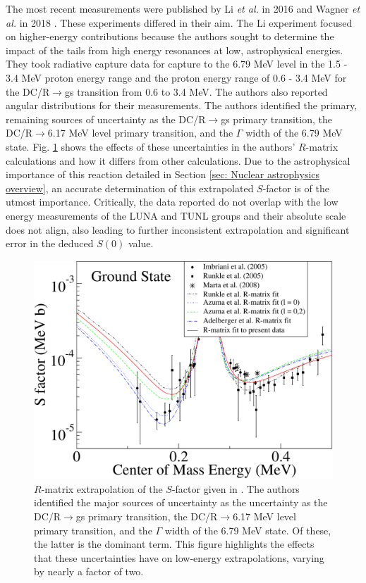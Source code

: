 The most recent measurements were published by Li \textit{et al.} in 2016 \cite{Li2016} and Wagner \textit{et al.} in 2018 \cite{Wagner2018}. These experiments differed in their aim. The Li experiment focused on higher-energy contributions because the authors sought to determine the impact of the tails from high energy resonances at low, astrophysical energies. They took radiative capture data for capture to the 6.79 MeV level in the 1.5 - 3.4 MeV proton energy range and the proton energy range of 0.6 - 3.4 MeV for the DC/R$\rightarrow$gs transition from 0.6 to 3.4 MeV. The authors also reported angular distributions for their measurements. The authors identified the primary, remaining sources of uncertainty as the DC/R$\rightarrow$gs primary transition, the DC/R$\rightarrow$6.17 MeV level primary transition, and the $\Gamma$ width of the 6.79 MeV state. Fig. \ref{fig: QianRmatrix} shows the effects of these uncertainties in the authors' $R$-matrix calculations and how it differs from other calculations. Due to the astrophysical importance of this reaction detailed in Section \ref{sec: Nuclear astrophysics overview}, an accurate determination of this extrapolated $S$-factor is of the utmost importance. Critically, the data reported do not overlap with the low energy measurements of the LUNA and TUNL groups and their absolute scale does not align, also leading to further inconsistent extrapolation and significant error in the deduced $S(0)$ value.

\begin{figure}
\includegraphics[width=\linewidth]{figures/qianSfactor.pdf}
\caption{$R$-matrix extrapolation of the $S$-factor given in \cite{Li2016}. The authors identified the major sources of uncertainty as the uncertainty as the DC/R$\rightarrow$gs primary transition, the DC/R$\rightarrow$6.17 MeV level primary transition, and the $\Gamma$ width of the 6.79 MeV state. Of these, the latter is the dominant term. This figure highlights the effects that these uncertainties have on low-energy extrapolations, varying by nearly a factor of two. }
\label{fig: QianRmatrix}
\end{figure}

